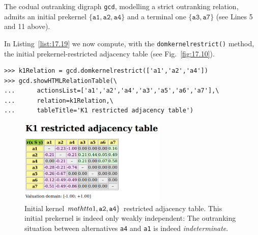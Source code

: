 The codual outranking digraph \texttt{gcd}, modelling a strict outranking relation, admits an initial prekernel $\{\mathtt{a1}, \mathtt{a2}, \mathtt{a4}\}$ and a terminal one $\{\mathtt{a3}, \mathtt{a7}\}$ (see Lines 5 and 11 above).

In Listing~\vref{list:17.19} we now compute, with the \texttt{domkernelrestrict()} method, the initial prekernel-restricted adjacency table (see Fig.~\vref{fig:17.10}).
\begin{lstlisting}[caption={Computing a dominant prekernel restricted adjancecy table},label=list:17.19]
>>> k1Relation = gcd.domkernelrestrict(['a1','a2','a4'])
>>> gcd.showHTMLRelationTable(\
...      actionsList=['a1','a2','a4','a3','a5','a6','a7'],\
...      relation=k1Relation,\
...      tableTitle='K1 restricted adjacency table')
\end{lstlisting}
\begin{figure}[ht]
\sidecaption[t]
\includegraphics[width=7cm]{Figures/17-10-k1restricted.png}
\caption{Initial kernel $\\mathtt{a1}, \mathtt{a2}, \mathtt{a4}\}$ restricted adjacency table. This initial prekernel is indeed only weakly independent: The outranking situation between alternatives \texttt{a4} and \texttt{a1} is indeed \emph{indeterminate}. }
\label{fig:17.10}       %
\end{figure}

